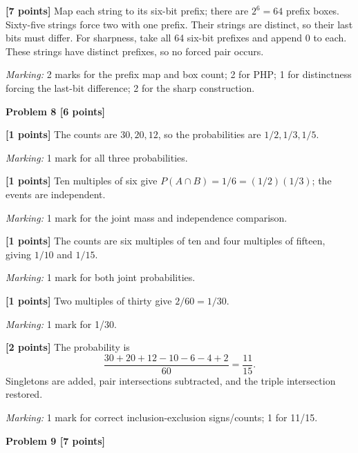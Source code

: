 \documentclass[12pt,letterpaper]{article}
\newcommand{\problemheading}[2][5\baselineskip]{\Needspace{#1}\par\noindent\hspace*{-0.625in}\textbf{#2}\par\nobreak\vspace{0.3em}}
\begin{document}
\begin{description}[font=\normalfont,leftmargin=1.2em,labelsep=0.4em]
\item[] \textbf{[7 points]} Map each string to its six-bit prefix; there are $2^6=64$ prefix boxes. Sixty-five strings force two with one prefix. Their strings are distinct, so their last bits must differ. For sharpness, take all 64 six-bit prefixes and append 0 to each. These strings have distinct prefixes, so no forced pair occurs.
\par\textit{Marking:} 2 marks for the prefix map and box count; 2 for PHP; 1 for distinctness forcing the last-bit difference; 2 for the sharp construction.
\end{description}
\vspace{0.65em}
\problemheading[\dimexpr 3\baselineskip+4\baselineskip\relax]{Problem 8 [6 points]}
\begin{description}[font=\normalfont,leftmargin=1.2em,labelsep=0.4em]
\item[(a)] \textbf{[1 points]} The counts are $30,20,12$, so the probabilities are $1/2,1/3,1/5$.
\par\textit{Marking:} 1 mark for all three probabilities.
\item[(b)] \textbf{[1 points]} Ten multiples of six give $P(A\cap B)=1/6=(1/2)(1/3)$; the events are independent.
\par\textit{Marking:} 1 mark for the joint mass and independence comparison.
\item[(c)] \textbf{[1 points]} The counts are six multiples of ten and four multiples of fifteen, giving $1/10$ and $1/15$.
\par\textit{Marking:} 1 mark for both joint probabilities.
\item[(d)] \textbf{[1 points]} Two multiples of thirty give $2/60=1/30$.
\par\textit{Marking:} 1 mark for 1/30.
\item[(e)] \textbf{[2 points]} The probability is\[\frac{30+20+12-10-6-4+2}{60}=\frac{11}{15}.\]Singletons are added, pair intersections subtracted, and the triple intersection restored.
\par\textit{Marking:} 1 mark for correct inclusion-exclusion signs/counts; 1 for 11/15.
\end{description}
\vspace{0.65em}
\problemheading[\dimexpr 3\baselineskip+4\baselineskip\relax]{Problem 9 [7 points]}
\end{document}
